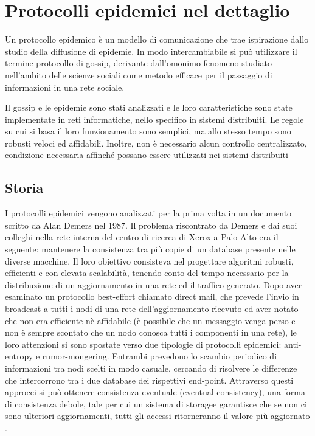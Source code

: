 \newpage
\chapter{Protocolli epidemici nel dettaglio}
\label{chap:epidemic}
Un protocollo epidemico è un modello di comunicazione che trae ispirazione dallo studio della diffusione di epidemie. In modo intercambiabile si può utilizzare il termine protocollo di gossip, derivante dall'omonimo fenomeno studiato nell'ambito delle scienze sociali come metodo efficace per il passaggio di informazioni in una rete sociale.

Il gossip e le epidemie sono stati analizzati e le loro caratteristiche sono state implementate in reti informatiche, nello specifico in sistemi distribuiti. Le regole su cui si basa il loro funzionamento sono semplici, ma allo stesso tempo sono robusti veloci ed affidabili. Inoltre, non è necessario alcun controllo centralizzato, condizione necessaria affinché possano essere utilizzati nei sistemi distribuiti

\section{Storia}
I protocolli epidemici vengono analizzati per la prima volta in un documento scritto da Alan Demers \cite{demers} nel 1987. Il problema riscontrato da Demers e dai suoi colleghi nella rete interna del centro di ricerca di Xerox a Palo Alto era il seguente: mantenere la consistenza tra più copie di un database presente nelle diverse macchine. Il loro obiettivo consisteva nel progettare algoritmi robusti, efficienti e con elevata scalabilità, tenendo conto del tempo necessario per la distribuzione di un aggiornamento in una rete ed il traffico generato. Dopo aver esaminato un protocollo best-effort chiamato direct mail, che prevede l'invio in broadcast a tutti i nodi di una rete dell'aggiornamento ricevuto ed aver notato che non era efficiente nè affidabile (è possibile che un messaggio venga perso e non è sempre scontato che un nodo conosca tutti i componenti in una rete), le loro attenzioni si sono spostate verso due tipologie di protocolli epidemici: anti-entropy e rumor-mongering. Entrambi prevedono lo scambio periodico di informazioni tra nodi scelti in modo casuale, cercando di risolvere le differenze che intercorrono tra i due database dei rispettivi end-point. Attraverso questi approcci si può ottenere consistenza eventuale (eventual consistency), una forma di consistenza debole, tale per cui un sistema di storagee garantisce che se non ci sono ulteriori aggiornamenti, tutti gli accessi ritorneranno il valore più aggiornato \cite{vogels}.

